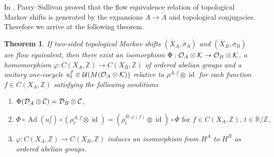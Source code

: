 \documentclass[11pt]{article}
\newtheorem{theorem}{Theorem}[section]
\theoremstyle{plain}
\theoremstyle{definition}
\numberwithin{equation}{section}
\renewcommand{\labelenumi}{\textup{(\theenumi)}}
\newcommand{\id}{\operatorname{id}}
\newcommand{\Ad}{\operatorname{Ad}}
\newcommand{\N}{\mathbb{N}}
\newcommand{\RZ}{\mathbb{R}/{\mathbb{Z}}}
\newcommand{\Z}{\mathbb{Z}}
\begin{document}
In \cite{PS}, Parry--Sullivan proved 
that the flow equivalence relation of topological Markov shifts 
is generated by the expansions $A \rightarrow \tilde{A}$
and topological conjugacies.
Therefore 
we arrive at the following theorem.
\begin{theorem}\label{thm:FETFAE}
If two-sided topological Markov shifts
$(\bar{X}_A, \bar{\sigma}_A)$ and $(\bar{X}_B,\bar{\sigma}_B)$
are flow equivalent,
then there exist an isomorphism
$\Phi:{{\mathcal{O}}_A}\otimes{\mathcal{K}} \rightarrow {{\mathcal{O}}_B}\otimes{\mathcal{K}}$,
a homomorphism
$\varphi:C(X_A,\Z) \rightarrow C(X_B,\Z)$
of ordered abelian groups
and 
a unitary one-cocycle
 $u_t^f \in {{\mathcal{U}}}(M({{\mathcal{O}}_A}\otimes{\mathcal{K}}))$ relative to 
$\rho^{A,f} \otimes\id$
for each function
$f\in C(X_A,\Z)$
satisfying the following conditions
\begin{enumerate}
\renewcommand{\theenumi}{\roman{enumi}}
\renewcommand{\labelenumi}{\textup{(\theenumi)}}
\item
$\Phi({{\mathcal{D}}_A}\otimes{\mathcal{C}}) = {{\mathcal{D}}_B}\otimes{\mathcal{C}}$,
\item
$\Phi \circ \Ad(u_t^f) \circ (\rho^{A,f}_t\otimes \id)
 = (\rho^{B,\varphi(f)}_t\otimes\id) \circ \Phi
\text{ for }
 f \in C(X_A,\Z), \, t \in \RZ,
$
\item
$\varphi:C(X_A,\Z) \rightarrow C(X_B,\Z)$
induces 
an isomorphism
from  
$H^A$
to  $H^B$
as ordered abelian groups.
\end{enumerate}
\end{theorem}
\end{document}
